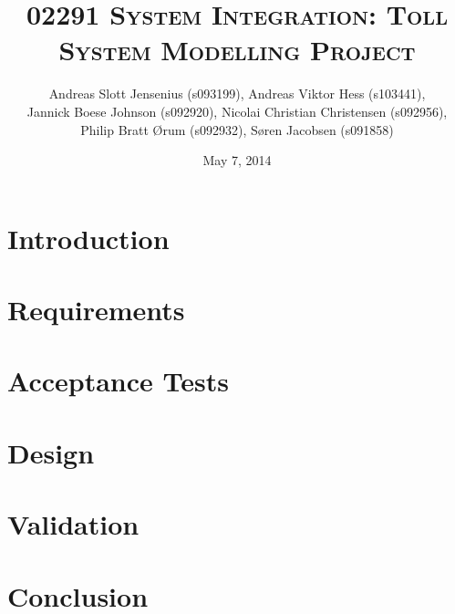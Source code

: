 \documentclass[11pt]{report}
\begin{document}
\title{\textsc{02291 System Integration: Toll System Modelling Project}}
\date{May 7, 2014}
\author{Andreas Slott Jensenius (s093199), Andreas Viktor Hess (s103441),\\
        Jannick Boese Johnson (s092920), Nicolai Christian Christensen (s092956),\\
        Philip Bratt Ørum (s092932), Søren Jacobsen (s091858)}
        

\maketitle

\fancyhead{}
\fancyfoot{}
\fancyfoot[C]{\thepage}

\pagestyle{fancy}

\tableofcontents


\chapter{Introduction}



\chapter{Requirements}


\chapter{Acceptance Tests}


\chapter{Design}


\chapter{Validation}


\chapter{Conclusion}

\end{document}

